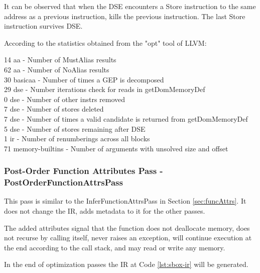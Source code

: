 It can be observed that when the DSE encounters a Store instruction to the same address as a previous instruction, kills the previous instruction. The last Store instruction survives DSE.

According to the statistics obtained from the "opt" tool of LLVM:
\begin{displayquote}
14 aa              - Number of MustAlias results \\
62 aa              - Number of NoAlias results \\
30 basicaa         - Number of times a GEP is decomposed \\
29 dse             - Number iterations check for reads in getDomMemoryDef \\
 0 dse             - Number of other instrs removed \\
 7 dse             - Number of stores deleted \\
 7 dse             - Number of times a valid candidate is returned from getDomMemoryDef \\
 5 dse             - Number of stores remaining after DSE \\
 1 ir              - Number of renumberings across all blocks \\
71 memory-builtins - Number of arguments with unsolved size and offset \\
\end{displayquote}

\subsubsection{Post-Order Function Attributes Pass - PostOrderFunctionAttrsPass}
This pass is similar to the InferFunctionAttrsPass in Section \ref{sec:funcAttrs}. It does not change the IR, adds metadata to it for the other passes.




The added attributes signal that the function does not deallocate memory, does not recurse by calling itself, never raises an exception, will continue execution at the end according to the call stack, and may read or write any memory. 

In the end of optimization passes the IR at Code \ref{lst:sbox-ir} will be generated.

